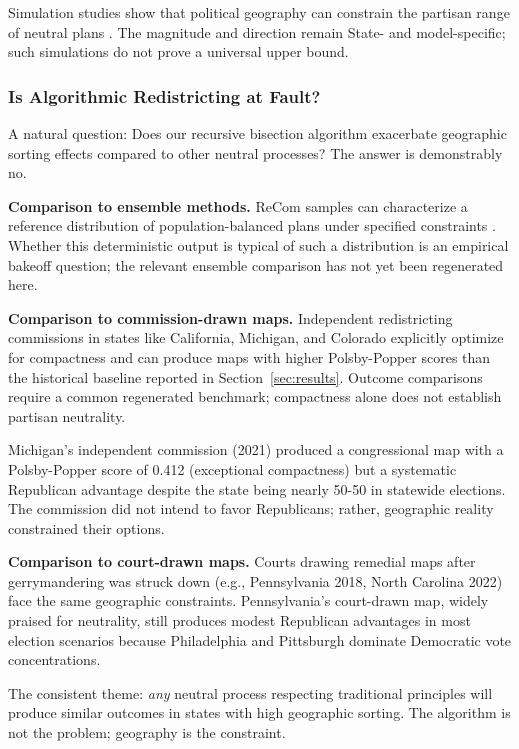Simulation studies show that political geography can constrain the partisan range of neutral plans \citep{chen2017impact}. The magnitude and direction remain State- and model-specific; such simulations do not prove a universal upper bound.

\subsubsection{Is Algorithmic Redistricting at Fault?}

A natural question: Does our recursive bisection algorithm exacerbate geographic sorting effects compared to other neutral processes? The answer is demonstrably no.

\textbf{Comparison to ensemble methods.} ReCom samples can characterize a reference distribution of population-balanced plans under specified constraints \citep{deford2019}. Whether this deterministic output is typical of such a distribution is an empirical bakeoff question; the relevant ensemble comparison has not yet been regenerated here.

\textbf{Comparison to commission-drawn maps.} Independent redistricting commissions in states like California, Michigan, and Colorado explicitly optimize for compactness and can produce maps with higher Polsby-Popper scores than the historical baseline reported in Section~\ref{sec:results}. Outcome comparisons require a common regenerated benchmark; compactness alone does not establish partisan neutrality.

Michigan's independent commission (2021) produced a congressional map with a Polsby-Popper score of 0.412 (exceptional compactness) but a systematic Republican advantage despite the state being nearly 50-50 in statewide elections. The commission did not intend to favor Republicans; rather, geographic reality constrained their options.

\textbf{Comparison to court-drawn maps.} Courts drawing remedial maps after gerrymandering was struck down (e.g., Pennsylvania 2018, North Carolina 2022) face the same geographic constraints. Pennsylvania's court-drawn map, widely praised for neutrality, still produces modest Republican advantages in most election scenarios because Philadelphia and Pittsburgh dominate Democratic vote concentrations.

The consistent theme: \textit{any} neutral process respecting traditional principles will produce similar outcomes in states with high geographic sorting. The algorithm is not the problem; geography is the constraint.

